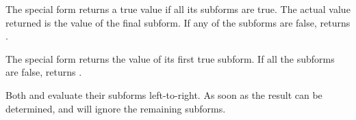 The special form
 returns a true value if all its subforms are true.  The
actual value returned is the value of the final
subform.  If any of the subforms are false, 
returns .


\n The special form  returns the value of its
first true subform.  If all the subforms are false,
 returns .


\n Both  and  evaluate their subforms
left-to-right.  As soon as the result can be
determined,  and  will ignore the
remaining subforms.

